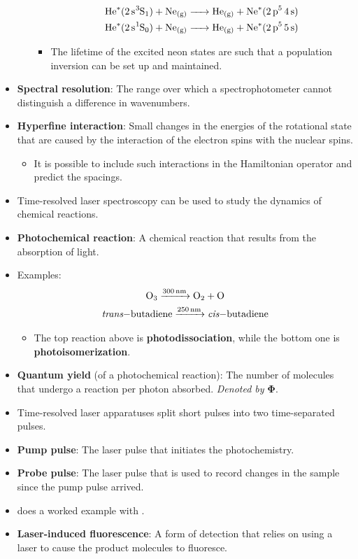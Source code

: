 \documentclass[../notes.tex]{subfiles}
\begin{document}
\begin{itemize}
\begin{itemize}
\begin{itemize}
\begin{gather*}
                \ce{He^{$*$}(2s{}^3S1) + Ne_{(g)} -> He_{(g)} + Ne^{$*$}(2p^5 4s)}\\
                \ce{He^{$*$}(2s{}^1S0) + Ne_{(g)} -> He_{(g)} + Ne^{$*$}(2p^5 5s)}
            \end{gather*}
            \item The lifetime of the excited neon states are such that a population inversion can be set up and maintained.
        \end{itemize}
    \end{itemize}
    \item \textbf{Spectral resolution}: The range over which a spectrophotometer cannot distinguish a difference in wavenumbers.
    \item \textbf{Hyperfine interaction}: Small changes in the energies of the rotational state that are caused by the interaction of the electron spins with the nuclear spins.
    \begin{itemize}
        \item It is possible to include such interactions in the Hamiltonian operator and predict the spacings.
    \end{itemize}
    \item Time-resolved laser spectroscopy can be used to study the dynamics of chemical reactions.
    \item \textbf{Photochemical reaction}: A chemical reaction that results from the absorption of light.
    \item Examples:
    \begin{gather*}
        \ce{O3 ->[\SI{300}{\nano\meter}] O2 + O}\\
        \ce{\emph{trans}-butadiene ->[\SI{250}{\nano\meter}] \emph{cis}-butadiene}
    \end{gather*}
    \begin{itemize}
        \item The top reaction above is \textbf{photodissociation}, while the bottom one is \textbf{photoisomerization}.
    \end{itemize}
    \item \textbf{Quantum yield} (of a photochemical reaction): The number of molecules that undergo a reaction per photon absorbed. \emph{Denoted by} $\bm{\Phi}$.
    \item Time-resolved laser apparatuses split short pulses into two time-separated pulses.
    \item \textbf{Pump pulse}: The laser pulse that initiates the photochemistry.
    \item \textbf{Probe pulse}: The laser pulse that is used to record changes in the sample since the pump pulse arrived.
    \item \textcite{bib:McQuarrieSimon} does a worked example with .
    \item \textbf{Laser-induced fluorescence}: A form of detection that relies on using a laser to cause the product molecules to fluoresce.
\end{itemize}
\end{document}
